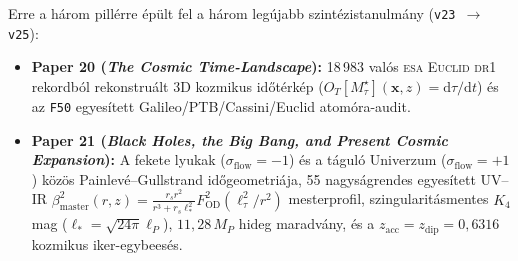 \documentclass[11pt,a4paper]{article}
\begin{document}
Erre a három pillérre épült fel a három legújabb szintézistanulmány (\texttt{v23 $\to$ v25}):
\begin{itemize}[leftmargin=1.5em]
\item \textbf{Paper 20 (\emph{The Cosmic Time-Landscape}):} 18\,983 valós \textsc{esa Euclid dr1} rekordból rekonstruált 3D kozmikus id\H{o}térkép ($O_T[M_\tau^\star](\mathbf{x},z) = \mathrm{d}\tau/\mathrm{d}t$) és az \texttt{F50} egyesített Galileo/PTB/Cassini/Euclid atomóra-audit.
\item \textbf{Paper 21 (\emph{Black Holes, the Big Bang, and Present Cosmic Expansion}):} A fekete lyukak ($\sigma_{\mathrm{flow}}=-1$) és a táguló Univerzum ($\sigma_{\mathrm{flow}}=+1$) közös Painlevé--Gullstrand id\H{o}geometriája, 55 nagyságrendes egyesített UV--IR $\beta_{\mathrm{master}}^2(r,z) = \frac{r_s r^2}{r^3+r_s\ell_*^2}F_{\mathrm{OD}}^2(\ell_\tau^2/r^2)$ mesterprofil, szingularitásmentes $K_4$ mag ($\ell_* = \sqrt{24\pi}\ell_P$), $11{,}28\,M_P$ hideg maradvány, és a $z_{\mathrm{acc}} = z_{\mathrm{dip}} = 0{,}6316$ kozmikus iker-egybeesés.

\end{itemize}
\end{document}
